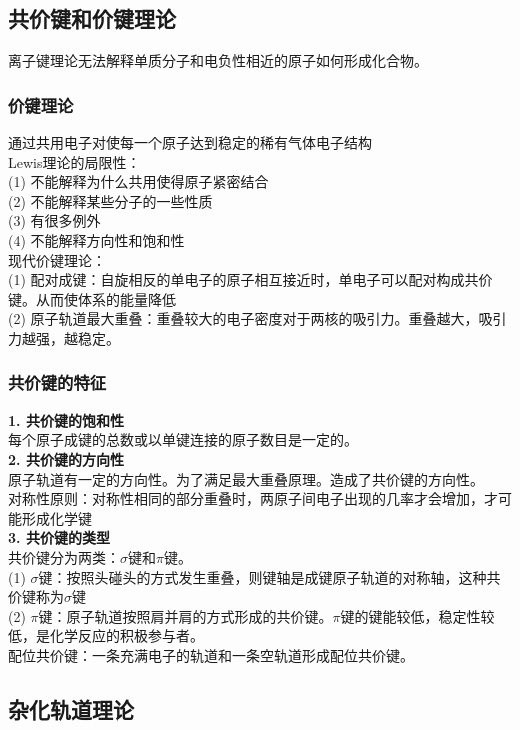 \documentclass[utf8,a4paper,12pt]{ctexart}
\begin{document}
\subsection{共价键和价键理论}
离子键理论无法解释单质分子和电负性相近的原子如何形成化合物。\\
\subsubsection{价键理论}
通过共用电子对使每一个原子达到稳定的稀有气体电子结构\\
Lewis理论的局限性：\\
(1) 不能解释为什么共用使得原子紧密结合\\
(2) 不能解释某些分子的一些性质\\
(3) 有很多例外\\
(4) 不能解释方向性和饱和性\\
现代价键理论：\\
(1) 配对成键：自旋相反的单电子的原子相互接近时，单电子可以配对构成共价键。从而使体系的能量降低\\
(2) 原子轨道最大重叠：重叠较大的电子密度对于两核的吸引力。重叠越大，吸引力越强，越稳定。\\
\subsubsection{共价键的特征}
{\bf 1. 共价键的饱和性}\\
每个原子成键的总数或以单键连接的原子数目是一定的。\\
{\bf 2. 共价键的方向性}\\
原子轨道有一定的方向性。为了满足最大重叠原理。造成了共价键的方向性。\\
对称性原则：对称性相同的部分重叠时，两原子间电子出现的几率才会增加，才可能形成化学键\\
{\bf 3. 共价键的类型}\\
共价键分为两类：$\sigma$键和$\pi$键。\\
(1) $\sigma$键：按照头碰头的方式发生重叠，则键轴是成键原子轨道的对称轴，这种共价键称为$\sigma$键\\
(2) $\pi$键：原子轨道按照肩并肩的方式形成的共价键。$\pi$键的键能较低，稳定性较低，是化学反应的积极参与者。\\
配位共价键：一条充满电子的轨道和一条空轨道形成配位共价键。

\subsection{杂化轨道理论}
\end{document}

